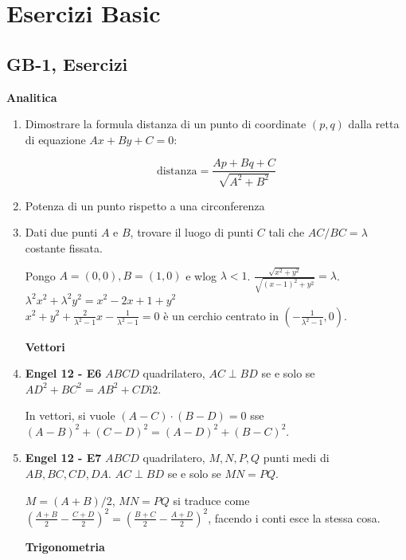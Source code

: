 


\clearpage
\section{Esercizi Basic}
\subsection{GB-1, Esercizi}
\textbf{Analitica}
\begin{enumerate}
\item  Dimostrare la formula distanza di un punto di coordinate $(p,q)$ dalla retta di equazione $Ax+By+C=0$:

$$\text{distanza}=\frac{Ap+Bq+C}{\sqrt{A^2+B^2}}$$

\item  Potenza di un punto rispetto a una circonferenza

\item Dati due punti $A$ e $B$, trovare il luogo di punti $C$ tali che $AC/BC=\lambda$ costante fissata.\\
\begin{sol}
 Pongo $A=(0,0),B=(1,0)$ e wlog $\lambda < 1$. $\frac{\sqrt{x^2+y^2}}{\sqrt{(x-1)^2+y^2}}=\lambda$.\\
 $\lambda^2 x^2 + \lambda^2 y^2 =x^2-2x+1+y^2$\\
 $ x^2+y^2+\frac{2}{\lambda^2-1}x - \frac{1}{\lambda^2-1}=0$
 è un cerchio centrato in $(-\frac{1}{\lambda^2-1},0)$.
\end{sol}

\textbf{Vettori}
\item \textbf{Engel 12 - E6} $ABCD$ quadrilatero, $AC\perp BD$ se e solo se $AD^2+BC^2=AB^2+CDì2$.\\
\begin{sol}
 In vettori, si vuole $(A-C)\cdot (B-D) = 0$ sse $(A-B)^2+(C-D)^2=(A-D)^2+(B-C)^2$.
\end{sol}

\item \textbf{Engel 12 - E7} $ABCD$ quadrilatero, $M,N,P,Q$ punti medi di $AB,BC,CD,DA$. $AC\perp BD$ se e solo se $MN=PQ$.\\
\begin{sol}
 $M=(A+B)/2$, $MN=PQ$ si traduce come $(\frac{A+B}{2}-\frac{C+D}{2})^2=(\frac{B+C}{2}-\frac{A+D}{2})^2$, facendo i conti esce la stessa cosa.
\end{sol}



\textbf{Trigonometria}


\end{enumerate}
